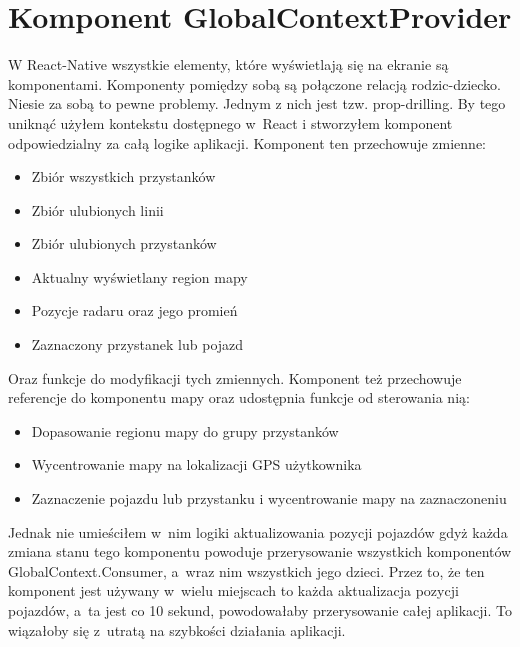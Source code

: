 \documentclass{SGGW-thesis}
\begin{document}
\section{Komponent GlobalContextProvider}
W React-Native wszystkie elementy, które wyświetlają się na ekranie są komponentami.
Komponenty pomiędzy sobą są połączone relacją rodzic-dziecko.
Niesie za sobą to pewne problemy.
Jednym z nich jest tzw. prop-drilling. %
By tego uniknąć użyłem kontekstu dostępnego w~React i stworzyłem komponent  odpowiedzialny za całą logike aplikacji.
Komponent ten przechowuje zmienne:
\begin{itemize}
  \item{Zbiór wszystkich przystanków}
  \item{Zbiór ulubionych linii}
  \item{Zbiór ulubionych przystanków}
  \item{Aktualny wyświetlany region mapy}
  \item{Pozycje radaru oraz jego promień}
  \item{Zaznaczony przystanek lub pojazd}
\end{itemize}
Oraz funkcje do modyfikacji tych zmiennych. %
Komponent też przechowuje referencje do komponentu mapy oraz udostępnia funkcje od sterowania nią:
\begin{itemize}
  \item{Dopasowanie regionu mapy do grupy przystanków}
  \item{Wycentrowanie mapy na lokalizacji GPS użytkownika}
  \item{Zaznaczenie pojazdu lub przystanku i wycentrowanie mapy na zaznaczoneniu}
\end{itemize}

Jednak nie umieściłem w~nim logiki aktualizowania pozycji pojazdów gdyż każda zmiana stanu
tego komponentu powoduje przerysowanie wszystkich komponentów GlobalContext.Consumer, a~wraz nim wszystkich jego dzieci.
Przez to, że ten komponent jest używany w~wielu miejscach to każda aktualizacja pozycji pojazdów, a~ta
jest co 10 sekund, powodowałaby przerysowanie całej aplikacji.
To wiązałoby się z~utratą na szybkości działania aplikacji.
\end{document}
